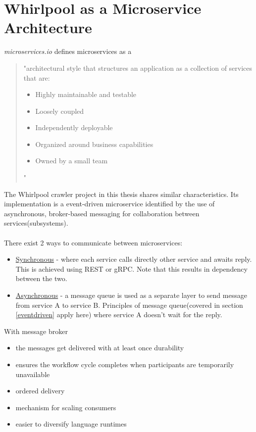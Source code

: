 \section{Whirlpool as a Microservice Architecture}
\emph{microservices.io} defines microservices as a 
\begin{quote}
  "architectural style that structures an application as a collection of services that
  are:
  \begin{itemize}
    \item Highly maintainable and testable
    \item Loosely coupled
    \item Independently deployable
    \item Organized around business capabilities
    \item Owned by a small team
  \end{itemize}
  "
\end{quote}
The Whirlpool crawler project in this thesis shares similar characteristics. Its implementation is a
event-driven microservice identified by the use of asynchronous, broker-based messaging for collaboration
between services(subsystems).
\\
\\
There exist 2 ways to communicate between microservices:
\begin{itemize}
\item \underline{Synchronous} - where each service calls directly other service and awaits reply.
  This is achieved using REST or gRPC. Note that this results in dependency between the two. 
\item \underline{Asynchronous} - a message queue is used as a separate layer to send message from
  service A to service B. Principles of message queue(covered in section \ref{eventdriven} apply here)
  where service A doesn't wait for the reply.
\end{itemize}

With message broker
\begin{itemize}
\item the messages get delivered with at least once durability
\item ensures the workflow cycle completes when participants are temporarily unavailable
\item ordered delivery
\item mechanism for scaling consumers
\item easier to diversify language runtimes
\end{itemize}

\pagebreak